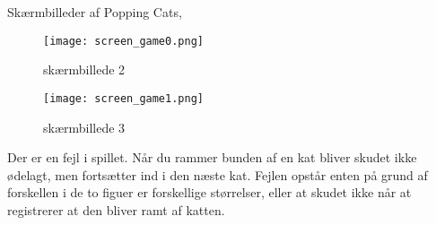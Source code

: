\documentclass[a4paper]{article}
\begin{document}
Skærmbilleder af Popping Cats,\\
\begin{figure}[h]
	\centering
	\texttt{[image: screen\_game0.png]}
	\caption{skærmbillede 2}
	\label{fig: skitse}
\end{figure}

\begin{figure}[h]
	\centering
	\texttt{[image: screen\_game1.png]}
	\caption{skærmbillede 3}
	\label{fig: skitse}
\end{figure}


Der er en fejl i spillet. Når du rammer bunden af en kat bliver skudet ikke ødelagt, men fortsætter ind i den næste kat. Fejlen opstår enten på grund af forskellen i de to figuer er forskellige størrelser, eller at skudet ikke når at registrerer at den bliver ramt af katten.
\end{document}
